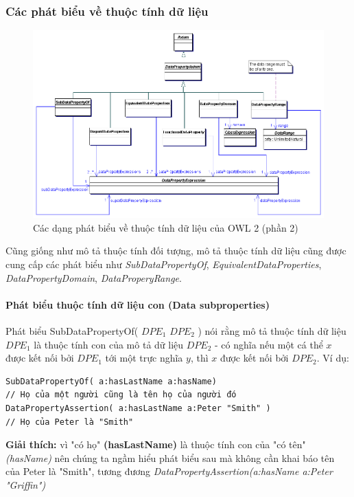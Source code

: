 \subsubsection{Các phát biểu về thuộc tính dữ liệu}
\begin{figure}[h]
	\centering
	\includegraphics[width=150mm]{Figures/datapropertyAxiom.png}
	\caption{Các dạng phát biểu về thuộc tính dữ liệu của OWL 2 (phần 2) \label{overflow}}
\end{figure}
Cũng giống như mô tả thuộc tính đối tượng, mô tả thuộc tính dữ liệu cũng được cung cấp các phát biểu như \textit{SubDataPropertyOf}, \textit{EquivalentDataProperties}, \textit{DataPropertyDomain}, \textit{DataProperyRange}.

\paragraph{Phát biểu thuộc tính dữ liệu con (Data subproperties)} Phát biểu SubDataPropertyOf( $DPE_{1}$ $DPE_{2}$ ) nói rằng mô tả thuộc tính dữ liệu $DPE_{1}$ là thuộc tính con của mô tả dữ liệu $DPE_{2}$ - có nghĩa nếu một cá thể $x$ được kết nối bởi $DPE_{1}$ tới một trực nghĩa $y$, thì $x$ được kết nối bởi $DPE_{2}$. Ví dụ:
\begin{verbatim}
SubDataPropertyOf( a:hasLastName a:hasName) 
// Họ của một người cũng là tên họ của người đó
DataPropertyAssertion( a:hasLastName a:Peter "Smith" )
// Họ của Peter là "Smith"
\end{verbatim}
\textbf{Giải thích:} vì "có họ" \textbf{(hasLastName)} là thuộc tính con của "có tên" \textit{(hasName)} nên chúng ta ngầm hiểu phát biểu sau mà không cần khai báo tên của Peter là "Smith", tương đương \textit{DataPropertyAssertion(a:hasName a:Peter "Griffin")}

